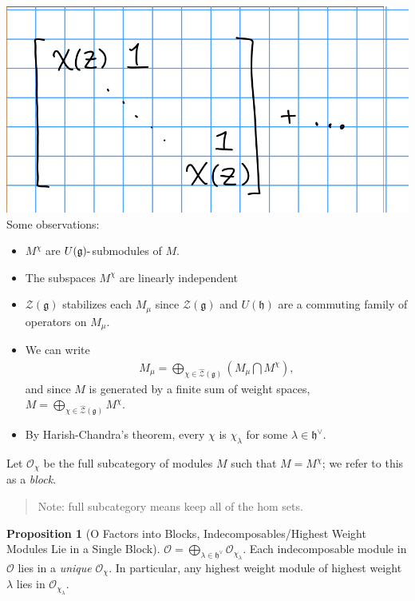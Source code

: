 \documentclass[11pt]{scrartcl}
\theoremstyle{definition}
\theoremstyle{theorem}
\newtheorem{proposition}[theorem]{Proposition}
\theoremstyle{proof}
\theoremstyle{definition}
\theoremstyle{break}
\theoremstyle{problem}
\providecommand{\tightlist}{%
  \setlength{\itemsep}{0pt}\setlength{\parskip}{0pt}}
\newcommand{\dash}[0]{{\hbox{-}}}
\newcommand{\dual}[0]{^\vee}
\newcommand{\intersect}[0]{\bigcap}
\newcommand{\lieg}[0]{{\mathfrak{g}}}
\newcommand{\lieh}[0]{{\mathfrak{h}}}
\newcommand{\OO}[0]{{\mathcal{O}}}
\newcommand{\mcz}[0]{{\mathcal{Z}}}
\renewcommand{\hat}[1]{\widehat{#1}}
\begin{document}
\includegraphics{figures/2020-02-12-09:15.png}\\

Some observations:

\begin{itemize}
\tightlist
\item
  \(M^\chi\) are \(U(\lieg)\dash\)submodules of \(M\).
\item
  The subspaces \(M^\chi\) are linearly independent
\item
  \(\mcz(\lieg)\) stabilizes each \(M_\mu\) since \(\mcz(\lieg)\) and
  \(U(\lieh)\) are a commuting family of operators on \(M_\mu\).
\item
  We can write
  \begin{align*}M_\mu = \bigoplus_{\chi \in \hat\mcz(\lieg)} (M_\mu \intersect M^\chi),\end{align*}
  and since \(M\) is generated by a finite sum of weight spaces,
  \(M = \bigoplus_{\chi \in \hat\mcz(\lieg)} M^\chi\).
\item
  By Harish-Chandra's theorem, every \(\chi\) is \(\chi_\lambda\) for
  some \(\lambda \in \lieh\dual\).
\end{itemize}

Let \(\OO_\chi\) be the full subcategory of modules \(M\) such that
\(M = M^\chi\); we refer to this as a \emph{block}.

\begin{quote}
Note: full subcategory means keep all of the hom sets.
\end{quote}

\begin{proposition}[O Factors into Blocks, Indecomposables/Highest Weight Modules Lie in a Single Block]

\(\OO = \bigoplus_{\lambda \in \lieh\dual} \OO_{\chi_\lambda}\). Each
indecomposable module in \(\OO\) lies in a \emph{unique} \(\OO_\chi\).
In particular, any highest weight module of highest weight \(\lambda\)
lies in \(\OO_{\chi_\lambda}\).\end{proposition}
\end{document}
